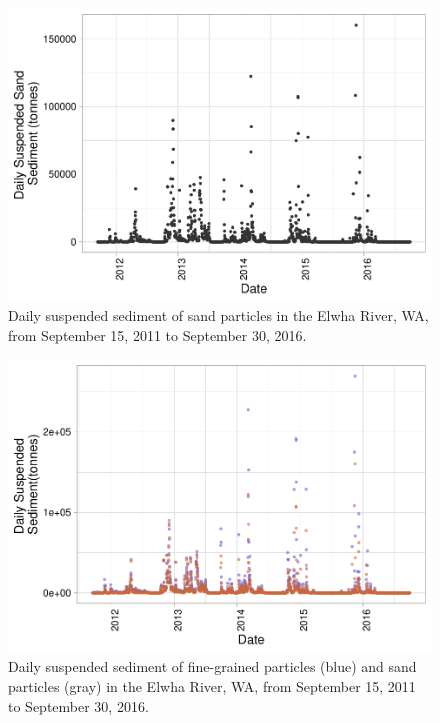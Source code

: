 \documentclass[12pt,]{article}
\begin{document}
\begin{figure}
\centering
\includegraphics{Mason_ENV872_ProjectFinal_files/figure-latex/Exploratory Analysis Figure 4-1.pdf}
\caption{Daily suspended sediment of sand particles in the Elwha River,
WA, from September 15, 2011 to September 30, 2016.}
\end{figure}

\begin{figure}
\centering
\includegraphics{Mason_ENV872_ProjectFinal_files/figure-latex/Exploratory Analysis Figure 5-1.pdf}
\caption{Daily suspended sediment of fine-grained particles (blue) and
sand particles (gray) in the Elwha River, WA, from September 15, 2011 to
September 30, 2016.}
\end{figure}
\end{document}
